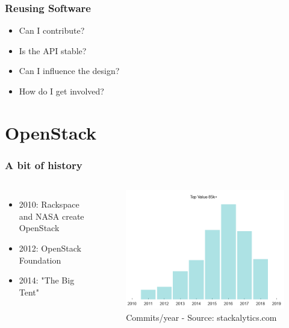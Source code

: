 \documentclass[aspectratio=169,11pt,hyperref={colorlinks=true}]{beamer}
\begin{document}
\begin{frame}
  \frametitle{Reusing Software}
    \begin{itemize}
        \item{Can I contribute?}
        \item{Is the API stable?}
        \item{Can I influence the design?}
        \item{How do I get involved?}
    \end{itemize}
\end{frame}

\section{OpenStack}
\begin{frame}
  \frametitle{A bit of history}
  \begin{columns}
      \begin{itemize}
          \item{2010: Rackspace and NASA create OpenStack}
          \item{2012: OpenStack Foundation}
          \item{2014: "The Big Tent"}
      \end{itemize}
      \begin{figure}
      \begin{center}
        \includegraphics[width=1\textwidth]{graphs/commits.png}
           \caption{Commits/year - Source: stackalytics.com}
      \end{center}
      \end{figure}
  \end{columns}
\end{frame}
\end{document}
